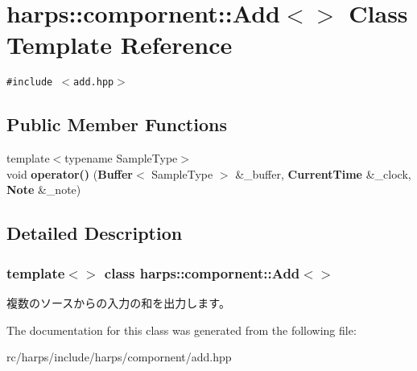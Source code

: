 \section{harps::compornent::Add$<$$>$ Class Template Reference}
\label{classharps_1_1compornent_1_1Add}
{\tt \#include $<$add.hpp$>$}

\subsection*{Public Member Functions}
\begin{CompactItemize}
\item 
{\footnotesize template$<$typename SampleType$>$ }\\void \textbf{operator()} ({\bf Buffer}$<$ SampleType $>$ \&\_\-buffer, {\bf CurrentTime} \&\_\-clock, {\bf Note} \&\_\-note)\label{classharps_1_1compornent_1_1Add_bd88ad5da1df02fc04751308c81401a9}

\end{CompactItemize}


\subsection{Detailed Description}
\subsubsection*{template$<$$>$ class harps::compornent::Add$<$$>$}

複数のソースからの入力の和を出力します。 

The documentation for this class was generated from the following file:\begin{CompactItemize}
\item 
rc/harps/include/harps/compornent/add.hpp\end{CompactItemize}
